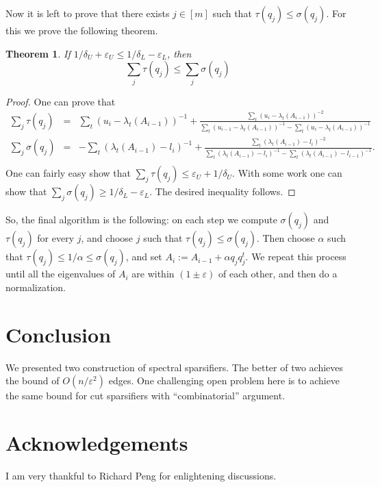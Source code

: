 \documentclass[12pt]{article}
\newcommand{\eps}{\varepsilon}
\newtheorem{theorem}{Theorem}
\begin{document}
    Now it is left to prove that there exists $j \in [m]$ such that $\tau(q_j) \leq \sigma(q_j)$.
    For this we prove the following theorem.

    \begin{theorem}
        If $1 / \delta_U + \eps_U \leq 1 / \delta_L - \eps_L$, then
        $$
            \sum_j \tau(q_j) \leq \sum_j \sigma(q_j)
        $$
    \end{theorem}
    \begin{proof}
        One can prove that
        \begin{eqnarray*}
            \sum_j \tau(q_j) &=& \sum_{t}(u_i - \lambda_t(A_{i-1}))^{-1} + \frac{\sum_t(u_i - \lambda_t(A_{i-1}))^{-2}}
            {\sum_t (u_{i-1} - \lambda_t(A_{i-1}))^{-1} - \sum_t (u_i - \lambda_t(A_{i-1}))^{-1}}\\
            \sum_j \sigma(q_j) &=& -\sum_t(\lambda_t(A_{i-1}) - l_i)^{-1} + \frac{\sum_t(\lambda_t(A_{i-1}) - l_i)^{-2}}
            {\sum_t(\lambda_t(A_{i-1}) - l_i)^{-1} - \sum_t(\lambda_t(A_{i-1}) - l_{i-1})^{-1}}.\\
        \end{eqnarray*}
        One can fairly easy show that $\sum_j \tau(q_j) \leq \eps_U + 1 / \delta_U$. With some work
        one can show that $\sum_j \sigma(q_j) \geq 1 / \delta_L - \eps_L$. The desired inequality follows.
    \end{proof}

    So, the final algorithm is the following: on each step we compute $\sigma(q_j)$ and $\tau(q_j)$ for every
    $j$, and choose $j$ such that $\tau(q_j) \leq \sigma(q_j)$. Then choose $\alpha$ such that
    $\tau(q_j) \leq 1 / \alpha \leq \sigma(q_j)$, and set $A_i := A_{i-1} + \alpha q_j q_j^t$.
    We repeat this process until all the eigenvalues of $A_i$ are within $(1 \pm \eps)$ of each other, and then do a
    normalization.

    \section{Conclusion}

    We presented two construction of spectral sparsifiers. The better of two achieves
    the bound of $O(n / \eps^2)$ edges. One challenging open problem here is to achieve
    the same bound for cut sparsifiers with ``combinatorial'' argument.

    \section{Acknowledgements}

    I am very thankful to Richard Peng for enlightening discussions.
    
    
\end{document}
